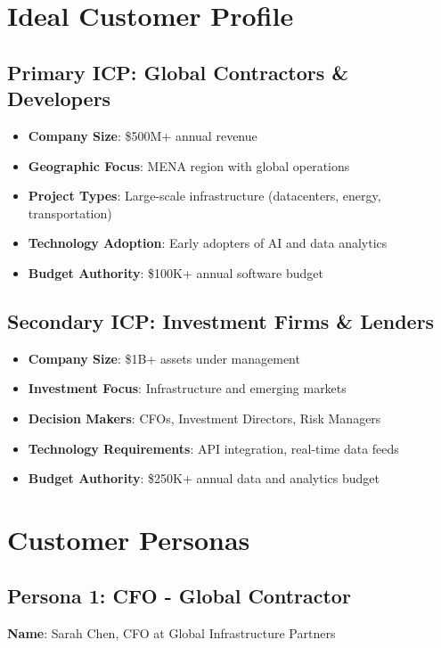 \documentclass[business]{../templates/infraradar-main}
\begin{document}
\section{Ideal Customer Profile}

\subsection{Primary ICP: Global Contractors \& Developers}
\begin{itemize}
    \item \textbf{Company Size}: \$500M+ annual revenue
    \item \textbf{Geographic Focus}: MENA region with global operations
    \item \textbf{Project Types}: Large-scale infrastructure (datacenters, energy, transportation)
    \item \textbf{Technology Adoption}: Early adopters of AI and data analytics
    \item \textbf{Budget Authority}: \$100K+ annual software budget
\end{itemize}

\subsection{Secondary ICP: Investment Firms \& Lenders}
\begin{itemize}
    \item \textbf{Company Size}: \$1B+ assets under management
    \item \textbf{Investment Focus}: Infrastructure and emerging markets
    \item \textbf{Decision Makers}: CFOs, Investment Directors, Risk Managers
    \item \textbf{Technology Requirements}: API integration, real-time data feeds
    \item \textbf{Budget Authority}: \$250K+ annual data and analytics budget
\end{itemize}

\section{Customer Personas}

\subsection{Persona 1: CFO - Global Contractor}
\textbf{Name}: Sarah Chen, CFO at Global Infrastructure Partners
\end{document}
